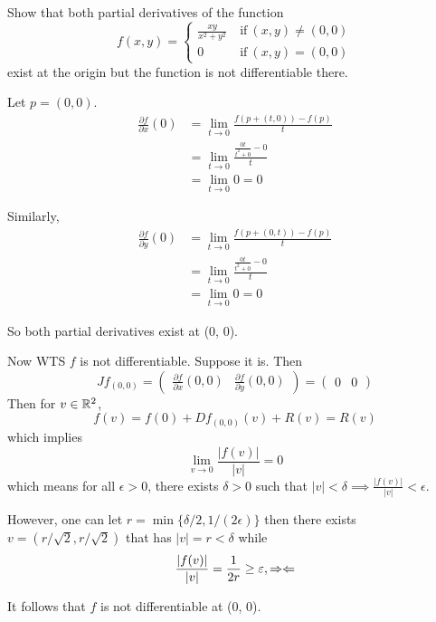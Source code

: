 \documentclass[a4paper, 12pt]{article}
\begin{document}
\begin{problem} 
Show that both partial derivatives of the function \[
    f(x, y) = \begin{cases}
        \frac{xy}{x^2 + y^2} & \:\text{if}\: (x, y) \neq (0, 0) \\
        0                    & \:\text{if}\: (x, y) = (0, 0)
    \end{cases}
\]
exist at the origin but the function is not differentiable there.
\end{problem}
\begin{solution}
    Let $p = (0, 0)$.
    \begin{align*}
        \frac{\partial f}{\partial x} (0) & = \lim_{t\to 0}\frac{f(p + (t, 0)) - f(p)}{t}    \\
                                          & = \lim_{t \to 0}\frac{\frac{0t}{t^2 + 0} - 0}{t} \\
                                          & = \lim_{t \to 0} 0 = 0
    \end{align*}

    Similarly, \begin{align*}
        \frac{\partial f}{\partial y} (0) & = \lim_{t\to 0}\frac{f(p + (0, t)) - f(p)}{t}    \\
                                          & = \lim_{t \to 0}\frac{\frac{0t}{t^2 + 0} - 0}{t} \\
                                          & = \lim_{t \to 0} 0 = 0
    \end{align*}

    So both partial derivatives exist at (0, 0).

    Now WTS $f$ is not differentiable. Suppose it is. Then \[
        Jf_{(0, 0)} = \begin{pmatrix}
            \frac{\partial f}{\partial x}(0, 0) &
            \frac{\partial f}{\partial y}(0, 0)
        \end{pmatrix} = \begin{pmatrix}
            0 & 0
        \end{pmatrix}
    \]
    Then for $v \in \mathbb{R}^2$, \[
        f(v) = f(0) + Df_{(0, 0)}(v) + R(v) = R(v)
    \]
    which implies \[
        \lim_{v \to 0} \frac{|f(v)|}{|v|} = 0
    \]
    which means for all $\epsilon > 0$, there exists $\delta > 0 $ such that $|v| < \delta \implies \frac{|f(v)|}{|v|} < \epsilon$.

    However, one can let $r = \min\{\delta/2, 1/(2\epsilon)\}$ then there exists $v = (r/\sqrt{2}, r/\sqrt{2})$ that has $|v| = r < \delta $ while \[
        \frac{|f(v)|}{|v|} = \frac{1}{2r} \geq \varepsilon, \Rightarrow\Leftarrow
    \]

    It follows that $f$ is not differentiable at (0, 0).
\end{solution}
\end{document}
